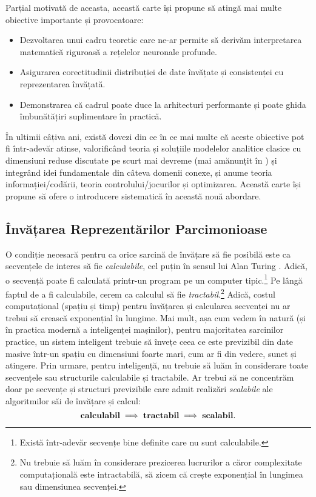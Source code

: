 \documentclass[../../book-main_ro.tex]{subfiles}
\begin{document}
Parțial motivată de aceasta, această carte își propune să atingă mai multe obiective importante și provocatoare:
\begin{itemize}
    \item Dezvoltarea unui cadru teoretic care ne-ar permite să derivăm interpretarea matematică riguroasă a rețelelor neuronale profunde.
    \item Asigurarea corectitudinii distribuției de date învățate și consistenței cu reprezentarea învățată.
    \item Demonstrarea că cadrul poate duce la arhitecturi performante și poate ghida îmbunătățiri suplimentare în practică.
\end{itemize}
În ultimii câțiva ani, există dovezi din ce în ce mai multe că aceste obiective pot fi într-adevăr atinse, valorificând teoria și soluțiile modelelor analitice clasice cu dimensiuni reduse discutate pe scurt mai devreme (mai amănunțit în ) și integrând idei fundamentale din câteva domenii conexe, și anume teoria informației/codării, teoria controlului/jocurilor și optimizarea. Această carte își propune să ofere o introducere sistematică în această nouă abordare.

\subsection{Învățarea Reprezentărilor Parcimonioase}
\label{sec:computational-approach-compression}
O condiție necesară pentru ca orice sarcină de învățare să fie posibilă este ca secvențele de interes să fie {\em calculabile}, cel puțin în sensul lui Alan Turing \cite{Turing-1936}. Adică, o secvență poate fi calculată printr-un program pe un computer tipic.\footnote{Există într-adevăr secvențe bine definite care nu sunt calculabile.} Pe lângă faptul de a fi calculabile, cerem ca calculul să fie {\em tractabil}.\footnote{Nu trebuie să luăm în considerare prezicerea lucrurilor a căror complexitate computațională este intractabilă, să zicem că crește exponențial în lungimea sau dimensiunea secvenței.} Adică, costul computațional (spațiu și timp) pentru învățarea și calcularea secvenței nu ar trebui să crească exponențial în lungime. Mai mult, așa cum vedem în natură (și în practica modernă a inteligenței mașinilor), pentru majoritatea sarcinilor practice, un sistem inteligent trebuie să învețe ceea ce este previzibil din date masive într-un spațiu cu dimensiuni foarte mari, cum ar fi din vedere, sunet și atingere. Prin urmare, pentru inteligență, nu trebuie să luăm în considerare toate secvențele sau structurile calculabile și tractabile. Ar trebui să ne concentrăm doar pe secvențe și structuri previzibile care admit realizări {\em scalabile} ale algoritmilor săi de învățare și calcul:
\begin{equation}
\mbox{\textbf{calculabil}} \;
   \Longrightarrow \; \mbox{\textbf{tractabil}} \; \Longrightarrow \;
   \mbox{\textbf{scalabil}}.
\end{equation}
\end{document}
